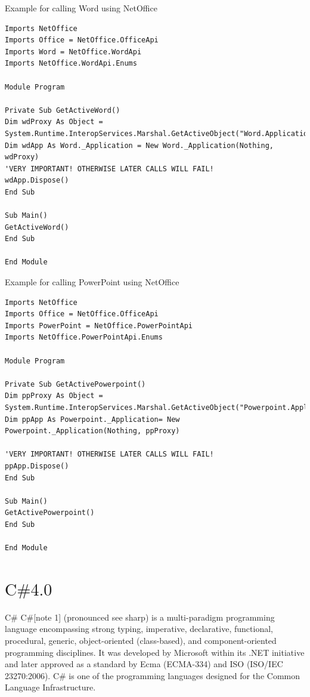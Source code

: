 \noindent Example for calling Word using NetOffice

\begin{lstlisting}
Imports NetOffice
Imports Office = NetOffice.OfficeApi
Imports Word = NetOffice.WordApi
Imports NetOffice.WordApi.Enums

Module Program

Private Sub GetActiveWord()
Dim wdProxy As Object = System.Runtime.InteropServices.Marshal.GetActiveObject("Word.Application")
Dim wdApp As Word._Application = New Word._Application(Nothing, wdProxy)
'VERY IMPORTANT! OTHERWISE LATER CALLS WILL FAIL!
wdApp.Dispose()
End Sub

Sub Main()
GetActiveWord()
End Sub

End Module
\end{lstlisting}



\newpage
\noindent Example for calling PowerPoint using NetOffice

\begin{lstlisting}
Imports NetOffice
Imports Office = NetOffice.OfficeApi
Imports PowerPoint = NetOffice.PowerPointApi
Imports NetOffice.PowerPointApi.Enums

Module Program

Private Sub GetActivePowerpoint()
Dim ppProxy As Object = System.Runtime.InteropServices.Marshal.GetActiveObject("Powerpoint.Application")
Dim ppApp As Powerpoint._Application= New Powerpoint._Application(Nothing, ppProxy)

'VERY IMPORTANT! OTHERWISE LATER CALLS WILL FAIL!
ppApp.Dispose()
End Sub

Sub Main()
GetActivePowerpoint()
End Sub

End Module
\end{lstlisting}




\newpage
\section{\texorpdfstring{$\text{C\# 4.0 } $}{CSharp}}
C\#
C\#[note 1] (pronounced see sharp) is a multi-paradigm programming language encompassing strong typing, imperative, declarative, functional, procedural, generic, object-oriented (class-based), and component-oriented programming disciplines. It was developed by Microsoft within its .NET initiative and later approved as a standard by Ecma (ECMA-334) and ISO (ISO/IEC 23270:2006). C\# is one of the programming languages designed for the Common Language Infrastructure.

